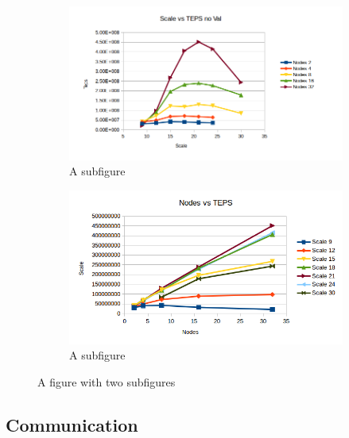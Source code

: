 \begin{figure}
\centering
\begin{subfigure}{.5\textwidth}
  \centering
  \includegraphics[width=\linewidth]{images/nodes_no_val.png}
  \caption{A subfigure}
  \label{fig:sub1}
\end{subfigure}%
\begin{subfigure}{.5\textwidth}
  \centering
  \includegraphics[width=\linewidth]{images/scales_no_val.png}
  \caption{A subfigure}
  \label{fig:sub2}
\end{subfigure}
\caption{A figure with two subfigures}
\label{fig:das_no_val}
\end{figure}


\subsection{Communication}

